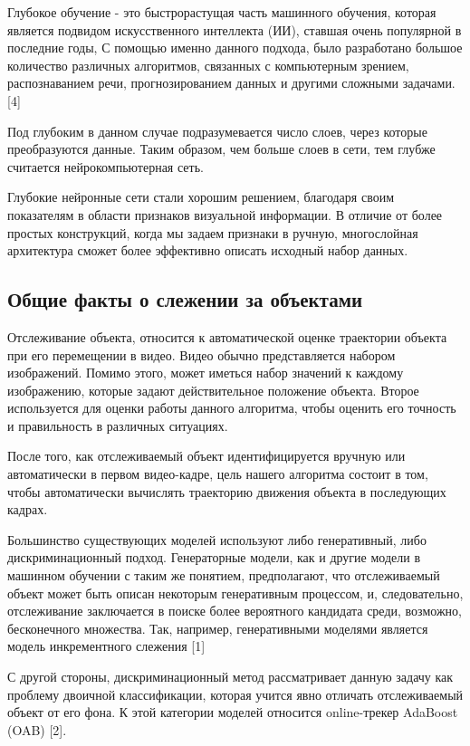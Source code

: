 \documentclass[14pt, a4paper]{article}
\begin{document}
Глубокое обучение - это быстрорастущая часть машинного обучения, которая является подвидом искусственного интеллекта (ИИ), ставшая очень популярной в последние годы, С помощью именно данного подхода, было разработано большое количество различных алгоритмов, связанных с компьютерным зрением, распознаванием речи, прогнозированием данных и другими сложными задачами. [4]

Под глубоким в данном случае подразумевается число слоев, через которые преобразуются данные. Таким образом, чем больше слоев в сети, тем глубже считается нейрокомпьютерная сеть. 

Глубокие нейронные сети стали хорошим решением, благодаря своим показателям в области признаков визуальной информации. В отличие от более простых конструкций, когда мы задаем признаки в ручную, многослойная архитектура сможет более эффективно описать исходный набор данных.

\subsection{Общие факты о слежении за объектами}

Отслеживание объекта, относится к автоматической оценке траектории объекта при его перемещении в видео. Видео обычно представляется набором изображений. Помимо этого, может иметься набор значений к каждому изображению, которые задают действительное положение объекта. Второе используется для оценки работы данного алгоритма, чтобы оценить его точность и правильность в различных ситуациях.

После того, как отслеживаемый объект идентифицируется вручную или автоматически в первом видео-кадре, цель нашего алгоритма состоит в том, чтобы автоматически вычислять траекторию движения объекта в последующих кадрах.

Большинство существующих моделей используют либо генеративный, либо дискриминационный подход. Генераторные модели, как и другие модели в машинном обучении с таким же понятием, предполагают, что отслеживаемый объект может быть описан некоторым генеративным процессом, и, следовательно, отслеживание заключается в поиске более вероятного кандидата среди, возможно, бесконечного множества. Так, например, генеративными моделями является модель инкрементного слежения [1]

С другой стороны, дискриминационный метод рассматривает данную задачу как проблему двоичной классификации, которая учится явно отличать отслеживаемый объект от его фона. К этой категории моделей относится online-трекер AdaBoost (OAB) [2].
\end{document}
